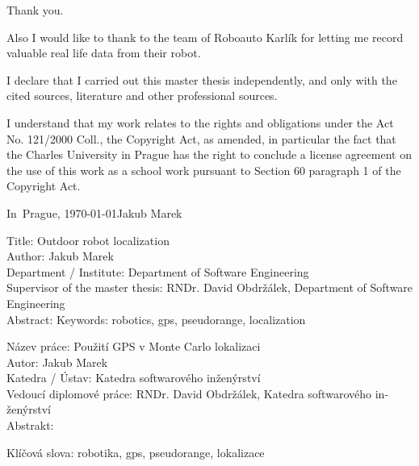 

\vspace{10mm} 

Thank you.

Also I would like to thank to the team of Roboauto Karlík for letting me
record valuable real life data from their robot.

\newpage

\vspace*{\fill}
I declare that I carried out this master thesis independently, and only with the cited
sources, literature and other professional sources.

I understand that my work relates to the rights and obligations under the Act No.
121/2000 Coll., the Copyright Act, as amended, in particular the fact that the Charles
University in Prague has the right to conclude a license agreement on the use of this
work as a school work pursuant to Section 60 paragraph 1 of the Copyright Act.

\vspace{10mm} 
\noindent In~Prague, \today\hspace{\fill}Jakub Marek\\
\newpage

\tableofcontents*
\newpage

\noindent
Title: Outdoor robot localization\\
Author: Jakub Marek\\
Department / Institute: Department of Software Engineering\\
Supervisor of the master thesis: RNDr. David Obdržálek, Department of Software Engineering\\

\noindent Abstract: 
\noindent Keywords: robotics, gps, pseudorange, localization

\vspace{25mm}

\begin{otherlanguage}{czech}
\noindent
Název práce: Použití GPS v Monte Carlo lokalizaci\\
Autor: Jakub Marek\\
Katedra / Ústav: Katedra softwarového inženýrství\\
Vedoucí diplomové práce: RNDr. David Obdržálek, Katedra softwarového inženýrství\\

\noindent Abstrakt: 

\noindent Klíčová slova: robotika, gps, pseudorange, lokalizace
\end{otherlanguage}

\newpage

